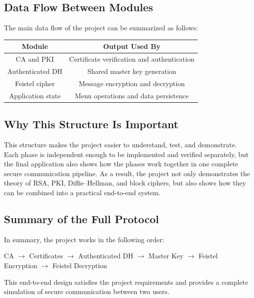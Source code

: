 \documentclass[12pt]{article}
\begin{document}
\subsection{Data Flow Between Modules}
The main data flow of the project can be summarized as follows:

\begin{center}
\begin{tabular}{|c|c|}
\hline
\textbf{Module} & \textbf{Output Used By} \\
\hline
CA and PKI & Certificate verification and authentication \\
\hline
Authenticated DH & Shared master key generation \\
\hline
Feistel cipher & Message encryption and decryption \\
\hline
Application state & Menu operations and data persistence \\
\hline
\end{tabular}
\end{center}

\subsection{Why This Structure Is Important}
This structure makes the project easier to understand, test, and demonstrate. Each phase is independent enough to be implemented and verified separately, but the final application also shows how the phases work together in one complete secure communication pipeline. As a result, the project not only demonstrates the theory of RSA, PKI, Diffie--Hellman, and block ciphers, but also shows how they can be combined into a practical end-to-end system.

\subsection{Summary of the Full Protocol}
In summary, the project works in the following order:
\begin{center}
CA $\rightarrow$ Certificates $\rightarrow$ Authenticated DH $\rightarrow$ Master Key $\rightarrow$ Feistel Encryption $\rightarrow$ Feistel Decryption
\end{center}

This end-to-end design satisfies the project requirements and provides a complete simulation of secure communication between two users.

\end{document}
